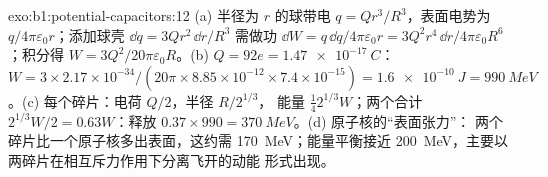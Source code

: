 \begin{solution}{exo:b1:potential-capacitors:12}
(a) 半径为 $r$ 的球带电 $q = Qr^3/R^3$，表面电势为
$q/4\pi\varepsilon_0r$；添加球壳 $\dd q = 3Qr^2\,\dd r/R^3$ 需做功 $\dd W =
q\,\dd q/4\pi\varepsilon_0r = 3Q^2r^4\,\dd r/4\pi\varepsilon_0R^6$；积分得 $W =
3Q^2/20\pi\varepsilon_0R$。(b) $Q = 92e = \qty{1.47e-17}{C}$：$W = 3 \times 2.17 \times
10^{-34}/(20\pi \times 8.85 \times 10^{-12} \times 7.4 \times 10^{-15}) = \qty{1.6e-10}{J}
= \qty{990}{MeV}$。(c) 每个碎片：电荷 $Q/2$，半径 $R/2^{1/3}$，
能量 $\tfrac14 2^{1/3}W$；两个合计 $2^{1/3}W/2 = 0.63W$：释放
$0.37 \times 990 = \qty{370}{MeV}$。(d) 原子核的“表面张力”：
两个碎片比一个原子核多出表面，这约需
\qty{170}{MeV}；能量平衡接近 \qty{200}{MeV}，主要以
两碎片在相互斥力作用下分离飞开的动能
形式出现。
\end{solution}

